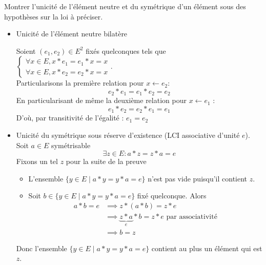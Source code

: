 \documentclass{article}
\renewenvironment{question_kholle}[2][ ]
{
	\subsection{\texorpdfstring{#2}{}}
	\notblank{#1}
	{
		\noindent #1
		\bigbreak
	}
	{}
	\begin{proof}
}
{
	\end{proof}
}
\begin{document}
\begin{question_kholle}{Montrer l'unicité de l'élément neutre et du symétrique d'un élément sous des hypothèses sur la loi à préciser.}
	\;\\
	\begin{itemize}[label=$\lozenge$]
		\item Unicité de l'élément neutre bilatère

		      Soient $(e_{1}, e_{2}) \in E^{2}$ fixés quelconques tels que $\left\{ \begin{array}{ll} \forall x \in E, x * e_{1} = e_{1} * x = x \\ \forall x \in E, x*e_{2}=e_{2}*x = x\end{array}\right.$.\\
		      Particularisons la première relation pour $x \leftarrow e_{2}$:
		      $$
			      e_{2}*e_{1} = e_{1}*e_{2} = e_{2}
		      $$
		      En particularisant de même la deuxième relation pour $x \leftarrow e_{1}$ :
		      $$
			      e_{1}*e_{2} = e_{2}*e_{1} = e_{1}
		      $$
		      D'où, par transitivité de l'égalité : $e_{1} = e_{2}$

		\item Unicité du symétrique sous réserve d'existence (LCI associative d'unité $e$).\\
		      Soit $a \in E$ symétrisable
		      $$
			      \exists z \in E : a * z = z*a = e
		      $$
		      Fixons un tel $z$ pour la suite de la preuve
		      \begin{itemize}
			      \item L'ensemble $\{ y \in E \mid a * y = y * a = e \}$ n'est pas vide puisqu'il contient $z$.

			      \item Soit $b \in \{ y \in E \mid a * y = y * a = e \}$ fixé quelconque.
			            Alors
			            \begin{align*}
				            a * b = e & \implies z * ( a * b ) = z * e                                          \\
				                      & \implies \underbrace{ z*a }_{ e } * b = z * e \text{ par associativité} \\
				                      & \implies b = z
			            \end{align*}
		      \end{itemize}
		      Donc l'ensemble $\{ y \in E \mid a * y = y * a = e \}$ contient au plus un élément qui est $z$.
	\end{itemize}
\end{question_kholle}
\end{document}
